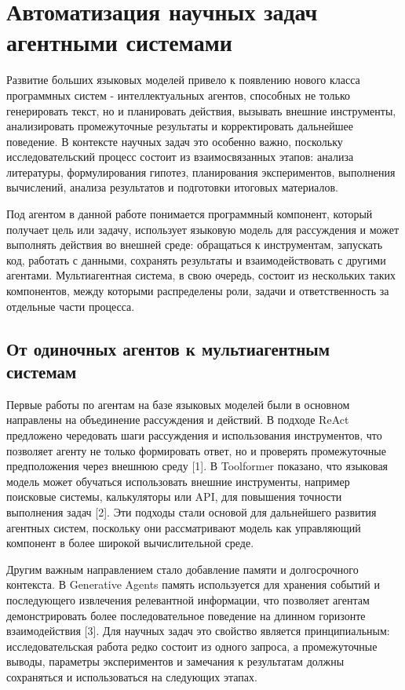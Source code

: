 \section{Автоматизация научных задач агентными системами}

Развитие больших языковых моделей привело к появлению нового класса программных систем - интеллектуальных агентов, способных не только генерировать текст, но и планировать действия, вызывать внешние инструменты, анализировать промежуточные результаты и корректировать дальнейшее поведение. В контексте научных задач это особенно важно, поскольку исследовательский процесс состоит из взаимосвязанных этапов: анализа литературы, формулирования гипотез, планирования экспериментов, выполнения вычислений, анализа результатов и подготовки итоговых материалов.

Под агентом в данной работе понимается программный компонент, который получает цель или задачу, использует языковую модель для рассуждения и может выполнять действия во внешней среде: обращаться к инструментам, запускать код, работать с данными, сохранять результаты и взаимодействовать с другими агентами. Мультиагентная система, в свою очередь, состоит из нескольких таких компонентов, между которыми распределены роли, задачи и ответственность за отдельные части процесса.

\subsection{От одиночных агентов к мультиагентным системам}

Первые работы по агентам на базе языковых моделей были в основном направлены на объединение рассуждения и действий. В подходе ReAct предложено чередовать шаги рассуждения и использования инструментов, что позволяет агенту не только формировать ответ, но и проверять промежуточные предположения через внешнюю среду [1]. В Toolformer показано, что языковая модель может обучаться использовать внешние инструменты, например поисковые системы, калькуляторы или API, для повышения точности выполнения задач [2]. Эти подходы стали основой для дальнейшего развития агентных систем, поскольку они рассматривают модель как управляющий компонент в более широкой вычислительной среде.

Другим важным направлением стало добавление памяти и долгосрочного контекста. В Generative Agents память используется для хранения событий и последующего извлечения релевантной информации, что позволяет агентам демонстрировать более последовательное поведение на длинном горизонте взаимодействия [3]. Для научных задач это свойство является принципиальным: исследовательская работа редко состоит из одного запроса, а промежуточные выводы, параметры экспериментов и замечания к результатам должны сохраняться и использоваться на следующих этапах.

